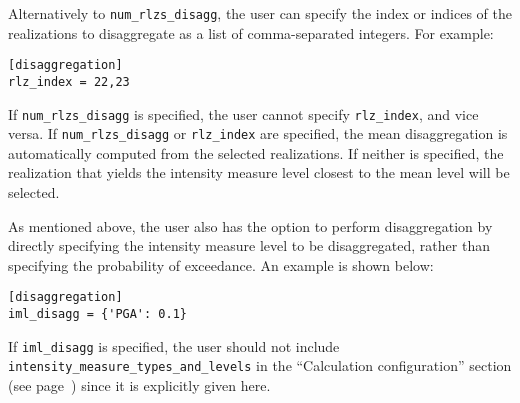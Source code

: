 Alternatively to \texttt{num\_rlzs\_disagg}, the user can specify the index or
indices of the realizations to disaggregate as a list of comma-separated
integers. For example:

\begin{verbatim}
[disaggregation]
rlz_index = 22,23
\end{verbatim}

If \texttt{num\_rlzs\_disagg} is specified, the user cannot specify
\texttt{rlz\_index}, and vice versa. If  \texttt{num\_rlzs\_disagg} or \texttt{rlz\_index} are
specified, the mean disaggregation is automatically computed from the
selected realizations.  If neither is specified, the realization that
yields the intensity measure level closest to the mean level will be
selected.

As mentioned above, the user also has the option to perform disaggregation by
directly specifying the intensity measure level to be disaggregated, rather than
specifying the probability of exceedance. An example is shown below:

\begin{verbatim}
[disaggregation]
iml_disagg = {'PGA': 0.1}
\end{verbatim}

If \texttt{iml\_disagg} is specified, the user should not include
\texttt{intensity\_measure\_types\_and\_levels} in the ``Calculation
configuration'' section (see page~\pageref{sec:calculation_configuration}) since
it is explicitly given here.
